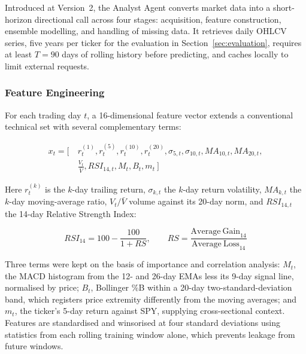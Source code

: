 \documentclass[conference]{IEEEtran}
\begin{document}
Introduced at Version~2, the Analyst Agent converts market data into a short-horizon directional call across four stages: acquisition, feature construction, ensemble modelling, and handling of missing data. It retrieves daily OHLCV series, five years per ticker for the evaluation in Section~\ref{sec:evaluation}, requires at least $T=90$ days of rolling history before predicting, and caches locally to limit external requests.

\subsubsection{Feature Engineering}

For each trading day $t$, a 16-dimensional feature vector extends a conventional technical set with several complementary terms:

\begin{equation}
\begin{aligned}
x_t = \big[\ &r_t^{(1)}, r_t^{(5)}, r_t^{(10)}, r_t^{(20)}, \sigma_{5,t}, \sigma_{10,t}, MA_{10,t}, MA_{20,t}, \\
&\textstyle\frac{V_t}{\bar{V}}, RSI_{14,t}, M_t, B_t, m_t\ \big]
\end{aligned}
\end{equation}

Here $r_t^{(k)}$ is the $k$-day trailing return, $\sigma_{k,t}$ the $k$-day return volatility, $MA_{k,t}$ the $k$-day moving-average ratio, $V_t/\bar V$ volume against its 20-day norm, and $RSI_{14,t}$ the 14-day Relative Strength Index:

\begin{equation}
RSI_{14} = 100 - \frac{100}{1 + RS}, \qquad RS = \frac{\mathrm{Average\ Gain}_{14}}{\mathrm{Average\ Loss}_{14}}
\end{equation}

Three terms were kept on the basis of importance and correlation analysis: $M_t$, the MACD histogram from the 12- and 26-day EMAs less its 9-day signal line, normalised by price; $B_t$, Bollinger \%B within a 20-day two-standard-deviation band, which registers price extremity differently from the moving averages; and $m_t$, the ticker's 5-day return against SPY, supplying cross-sectional context. Features are standardised and winsorised at four standard deviations using statistics from each rolling training window alone, which prevents leakage from future windows.
\end{document}
